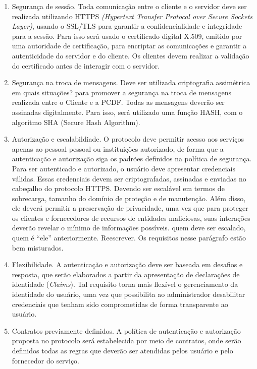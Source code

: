 \begin{enumerate}[RQ1]

\item Segurança de sessão. Toda comunicação entre o cliente e o servidor deve ser realizada utilizando HTTPS 
\emph{(Hypertext Transfer Protocol over Secure Sockets Layer)}, usando o SSL/TLS para garantir a confidencialidade 
e integridade para a sessão. Para isso será usado o certificado digital X.509, emitido por uma autoridade de certificação, 
para encriptar as comunicações e garantir a autenticidade do servidor e do cliente. Os clientes devem realizar a validação do 
certificado antes de interagir com o servidor.

\item Seguran\c ca na troca de mensagens. Deve ser utilizada criptografia assimétrica {\color{red} em quais situa\c c\~{o}es?} 
para promover a segurança na troca de mensagens realizada entre o Cliente e a PCDF. 
Todas as mensagens deverão ser assinadas digitalmente. Para isso, será utilizado uma função HASH, com o algoritmo SHA (Secure Hash Algorithm).

\item Autoriza\c c\~{a}o e escalabildiade. O protocolo deve permitir acesso aos serviços apenas ao pessoal {\color{red}pessoal ou institui\c c\~{o}es} 
autorizado, de forma que a autenticação e autorização siga os padrões definidos na política de segurança. Para ser autenticado e autorizado, o usuário 
deve apresentar credenciais válidas. Essas credenciais devem ser criptografadas, assinadas e enviadas no cabeçalho do protocolo HTTPS. 
Devendo ser escalável em termos de sobrecarga, tamanho do domínio de proteção e de manutenção. Além disso, ele deverá permitir a 
preservação de privacidade, uma vez que para proteger os clientes e fornecedores de recursos de entidades maliciosas, suas interações 
deverão revelar o mínimo de informações possíveis. {\color{red}quem deve ser escalado, quem \'{e} ``ele'' anteriormente. 
Reescrever. Os requisitos nesse par\'{a}grafo est\~{a}o bem misturados.} 

\item Flexibilidade. A autenticação e autorização deve ser baseada em desafios e resposta, que serão elaborados a partir da apresentação de declarações de identidade (\emph{Claims}). Tal requisito torna mais flexível o gerenciamento da identidade do usuário, uma vez que possibilita ao administrador desabilitar credenciais que tenham sido comprometidas de forma transparente ao usuário.

\item Contratos previamente definidos. A política de autenticação e autorização 
proposta no protocolo será estabelecida por meio de contratos, onde serão definidos 
todas as regras que deverão ser atendidas pelos usuário e pelo fornecedor do serviço.

\end{enumerate}

